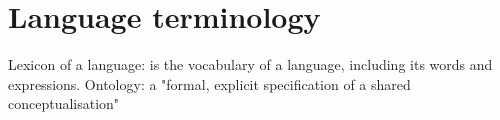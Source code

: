
\section{Language terminology \label{Appendix:Language}}

Lexicon of a language: is the vocabulary of a language, including its words and expressions.
Ontology: a "formal, explicit specification of a shared conceptualisation"

